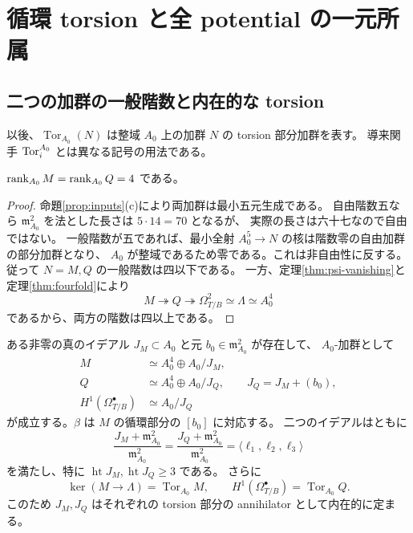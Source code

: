 \section{循環 torsion と全 potential の一元所属}\label{sec:obstruction}

\subsection{二つの加群の一般階数と内在的な torsion}

以後、$\operatorname{Tor}_{A_0}(N)$ は整域 $A_0$ 上の加群 $N$ の torsion 部分加群を表す。
導来関手 $\operatorname{Tor}_i^{A_0}$ とは異なる記号の用法である。

\begin{lemma}\label{lem:rank-bound}
$\operatorname{rank}_{A_0}M=\operatorname{rank}_{A_0}Q=4$ である。
\end{lemma}

\begin{proof}
命題\ref{prop:inputs}(c)により両加群は最小五元生成である。
自由階数五なら $\mathfrak m_{A_0}^2$ を法とした長さは $5\cdot14=70$ となるが、
実際の長さは六十七なので自由ではない。
一般階数が五であれば、最小全射 $A_0^5\to N$ の核は階数零の自由加群の部分加群となり、
$A_0$ が整域であるため零である。これは非自由性に反する。
従って $N=M,Q$ の一般階数は四以下である。
一方、定理\ref{thm:psi-vanishing}と定理\ref{thm:fourfold}により
\[
 M\twoheadrightarrow Q\twoheadrightarrow\Omega^2_{T/B}\simeq\Lambda\simeq A_0^4
\]
であるから、両方の階数は四以上である。
\end{proof}

\begin{theorem}[自由部分と循環障害]\label{thm:cyclic-torsion}
ある非零の真のイデアル $J_M\subset A_0$ と元 $b_0\in\mathfrak m_{A_0}^2$ が存在して、
$A_0$-加群として
\begin{align}
 M&\simeq A_0^4\oplus A_0/J_M,\label{eq:M-cyclic-v23}\\
 Q&\simeq A_0^4\oplus A_0/J_Q,\qquad J_Q=J_M+(b_0),\label{eq:Q-cyclic-v23}\\
 H^1(\Omega^\bullet_{T/B})&\simeq A_0/J_Q\label{eq:H1-cyclic-v23}
\end{align}
が成立する。$\beta$ は $M$ の循環部分の $[b_0]$ に対応する。
二つのイデアルはともに
\begin{equation}\label{eq:torsion-linear-parts}
 \frac{J_M+\mathfrak m_{A_0}^2}{\mathfrak m_{A_0}^2}
 =\frac{J_Q+\mathfrak m_{A_0}^2}{\mathfrak m_{A_0}^2}
 =\langle\ell_1,\ell_2,\ell_3\rangle
\end{equation}
を満たし、特に $\operatorname{ht}J_M,\operatorname{ht}J_Q\ge3$ である。
さらに
\[
 \ker(M\to\Lambda)=\operatorname{Tor}_{A_0}M,\qquad
 H^1(\Omega^\bullet_{T/B})=\operatorname{Tor}_{A_0}Q.
\]
このため $J_M,J_Q$ はそれぞれの torsion 部分の annihilator として内在的に定まる。
\end{theorem}

